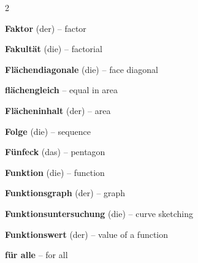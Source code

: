 \begin{multicols}{2}
\par\nopagebreak
\textbf{Faktor} (der) -- factor\dotfill\hyperref[e:23]{\pageref*{e:23}}\par
\textbf{Fakultät} (die) -- factorial\dotfill\hyperref[e:340]{\pageref*{e:340}}\par
\textbf{Flächendiagonale} (die) -- face diagonal\dotfill\hyperref[e:251]{\pageref*{e:251}}\par
\textbf{flächengleich} -- equal in area\dotfill\hyperref[e:195]{\pageref*{e:195}}\par
\textbf{Flächeninhalt} (der) -- area\dotfill\hyperref[e:210]{\pageref*{e:210}}\par
\textbf{Folge} (die) -- sequence\dotfill\hyperref[e:257]{\pageref*{e:257}}\par
\textbf{Fünfeck} (das) -- pentagon\dotfill\hyperref[e:206]{\pageref*{e:206}}\par
\textbf{Funktion} (die) -- function\dotfill\hyperref[e:105]{\pageref*{e:105}}\par
\textbf{Funktionsgraph} (der) -- graph\dotfill\hyperref[e:111]{\pageref*{e:111}}\par
\textbf{Funktionsuntersuchung} (die) -- curve sketching\dotfill\hyperref[e:280]{\pageref*{e:280}}\par
\textbf{Funktionswert} (der) -- value of a function\dotfill\hyperref[e:108]{\pageref*{e:108}}\par
\textbf{für alle} -- for all\dotfill\hyperref[e:352]{\pageref*{e:352}}\par


\end{multicols}
